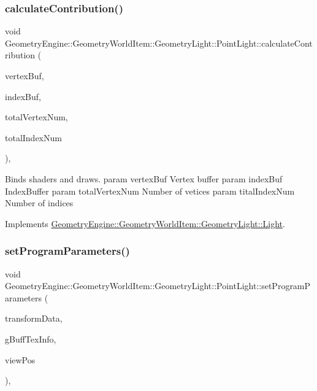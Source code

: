 \subsubsection{\texorpdfstring{calculateContribution()}{calculateContribution()}}
{\footnotesize\ttfamily void Geometry\+Engine\+::\+Geometry\+World\+Item\+::\+Geometry\+Light\+::\+Point\+Light\+::calculate\+Contribution (\begin{DoxyParamCaption}\item[{Q\+Open\+G\+L\+Buffer $\ast$}]{vertex\+Buf,  }\item[{Q\+Open\+G\+L\+Buffer $\ast$}]{index\+Buf,  }\item[{unsigned int}]{total\+Vertex\+Num,  }\item[{unsigned int}]{total\+Index\+Num }\end{DoxyParamCaption})\hspace{0.3cm}{\ttfamily [protected]}, {\ttfamily [virtual]}}

Binds shaders and draws. param vertex\+Buf Vertex buffer param index\+Buf Index\+Buffer param total\+Vertex\+Num Number of vetices param tital\+Index\+Num Number of indices 

Implements \mbox{\hyperlink{class_geometry_engine_1_1_geometry_world_item_1_1_geometry_light_1_1_light_a58aa2a3520f7aa2b03afcb4123e7530a}{Geometry\+Engine\+::\+Geometry\+World\+Item\+::\+Geometry\+Light\+::\+Light}}.

\mbox{\label{class_geometry_engine_1_1_geometry_world_item_1_1_geometry_light_1_1_point_light_acf3ebd411b36d95ba26ae41bcc25793a}} 
\subsubsection{\texorpdfstring{setProgramParameters()}{setProgramParameters()}}
{\footnotesize\ttfamily void Geometry\+Engine\+::\+Geometry\+World\+Item\+::\+Geometry\+Light\+::\+Point\+Light\+::set\+Program\+Parameters (\begin{DoxyParamCaption}\item[{const \mbox{\hyperlink{struct_geometry_engine_1_1_lighting_transformation_data}{Lighting\+Transformation\+Data}} \&}]{transform\+Data,  }\item[{const \mbox{\hyperlink{struct_geometry_engine_1_1_g_buffer_texture_info}{G\+Buffer\+Texture\+Info}} \&}]{g\+Buff\+Tex\+Info,  }\item[{const Q\+Vector3D \&}]{view\+Pos }\end{DoxyParamCaption})\hspace{0.3cm}{\ttfamily [protected]}, {\ttfamily [virtual]}}

